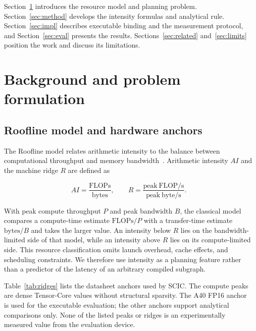 \documentclass[a4paper,fleqn]{cas-dc}
\begin{document}
Section~\ref{sec:background} introduces the resource model and planning problem.
Section~\ref{sec:method} develops the intensity formulas and analytical rule.
Section~\ref{sec:impl} describes executable binding and the measurement protocol, and Section~\ref{sec:eval} presents the results.
Sections~\ref{sec:related} and~\ref{sec:limits} position the work and discuss its limitations.

\section{Background and problem formulation}
\label{sec:background}

\subsection{Roofline model and hardware anchors}
\label{sec:roofline}

The Roofline model relates arithmetic intensity to the balance between computational throughput and memory bandwidth~\cite{Williams2009Roofline}.
Arithmetic intensity $AI$ and the machine ridge $R$ are defined as

\begin{equation}
  AI = \frac{\mathrm{FLOPs}}{\mathrm{bytes}}, \qquad
  R = \frac{\mathrm{peak\ FLOP/s}}{\mathrm{peak\ byte/s}}.
  \label{eq:roofline}
\end{equation}

With peak compute throughput $P$ and peak bandwidth $B$, the classical model compares a compute-time estimate $\mathrm{FLOPs}/P$ with a transfer-time estimate $\mathrm{bytes}/B$ and takes the larger value.
An intensity below $R$ lies on the bandwidth-limited side of that model, while an intensity above $R$ lies on its compute-limited side.
This resource classification omits launch overhead, cache effects, and scheduling constraints.
We therefore use intensity as a planning feature rather than a predictor of the latency of an arbitrary compiled subgraph.

Table~\ref{tab:ridges} lists the datasheet anchors used by SCIC.
The compute peaks are dense Tensor-Core values without structural sparsity.
The A40 FP16 anchor is used for the executable evaluation; the other anchors support analytical comparisons only.
None of the listed peaks or ridges is an experimentally measured value from the evaluation device.
\end{document}
